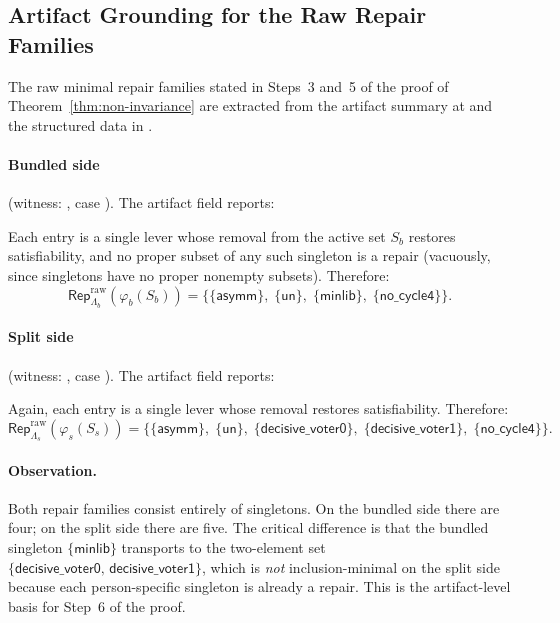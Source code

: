 \subsection{Artifact Grounding for the Raw Repair Families}
\label{sec:repair-artifact}

The raw minimal repair families stated in Steps~3 and~5 of the proof of Theorem~\ref{thm:non-invariance} are extracted from the artifact summary at
and the structured data in .

\paragraph{Bundled side}
(witness: , case ).
The artifact field  reports:
\begin{quote}
\end{quote}
Each entry is a single lever whose removal from the active set $S_b$ restores satisfiability,
and no proper subset of any such singleton is a repair (vacuously, since singletons have no proper nonempty subsets).
Therefore:
\[
  \mathsf{Rep}^{\mathrm{raw}}_{\Lambda_b}(\varphi_b(S_b))
  = \bigl\{\{\mathsf{asymm}\},\;\{\mathsf{un}\},\;\{\mathsf{minlib}\},\;\{\mathsf{no\_cycle4}\}\bigr\}.
\]

\paragraph{Split side}
(witness: , case ).
The artifact field  reports:
\begin{quote}
\end{quote}
Again, each entry is a single lever whose removal restores satisfiability.
Therefore:
\[
  \mathsf{Rep}^{\mathrm{raw}}_{\Lambda_s}(\varphi_s(S_s))
  = \bigl\{\{\mathsf{asymm}\},\;\{\mathsf{un}\},\;\{\mathsf{decisive\_voter0}\},\;\{\mathsf{decisive\_voter1}\},\;\{\mathsf{no\_cycle4}\}\bigr\}.
\]

\paragraph{Observation.}
Both repair families consist entirely of singletons.
On the bundled side there are four; on the split side there are five.
The critical difference is that the bundled singleton $\{\mathsf{minlib}\}$ transports to the two-element set $\{\mathsf{decisive\_voter0},\, \mathsf{decisive\_voter1}\}$, which is \emph{not} inclusion-minimal on the split side because each person-specific singleton is already a repair.
This is the artifact-level basis for Step~6 of the proof.

